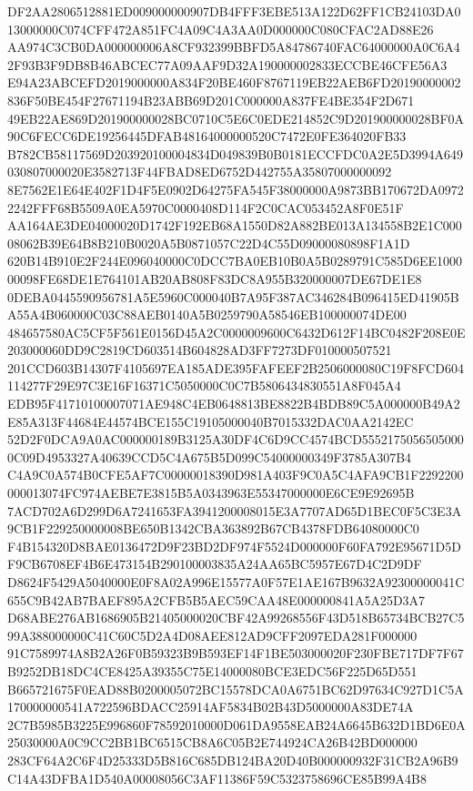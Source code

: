 \documentclass[UTF8,fontset=fandol,zihao=-4,a4paper]{ctexart}
\begin{document}
{{DF2AA2806512881ED009000000907DB4FFF3EBE513A122D62FF1CB24103DA013000000C074CFF472A851FC4A09C4A3AA0D000000C080CFAC2AD88E26
AA974C3CB0DA000000006A8CF932399BBFD5A84786740FAC64000000A0C6A42F93B3F9DB8B46ABCEC77A09AAF9D32A190000002833ECCBE46CFE56A3
E94A23ABCEFD2019000000A834F20BE460F8767119EB22AEB6FD20190000002836F50BE454F27671194B23ABB69D201C000000A837FE4BE354F2D671
49EB22AE869D201900000028BC0710C5E6C0EDE214852C9D201900000028BF0A90C6FECC6DE19256445DFAB48164000000520C7472E0FE364020FB33
B782CB58117569D203920100004834D049839B0B0181ECCFDC0A2E5D3994A649030807000020E3582713F44FBAD8ED6752D442755A35807000000092
8E7562E1E64E402F1D4F5E0902D64275FA545F38000000A9873BB170672DA09722242FFF68B5509A0EA5970C0000408D114F2C0CAC053452A8F0E51F
AA164AE3DE04000020D1742F192EB68A1550D82A882BE013A134558B2E1C00008062B39E64B8B210B0020A5B0871057C22D4C55D09000080898F1A1D
620B14B910E2F244E096040000C0DCC7BA0EB10B0A5B0289791C585D6EE100000098FE68DE1E764101AB20AB808F83DC8A955B320000007DE67DE1E8
0DEBA0445590956781A5E5960C000040B7A95F387AC346284B096415ED41905BA55A4B060000C03C88AEB0140A5B0259790A58546EB100000074DE00
484657580AC5CF5F561E0156D45A2C0000009600C6432D612F14BC0482F208E0E203000060DD9C2819CD603514B604828AD3FF7273DF010000507521
201CCD603B14307F4105697EA185ADE395FAFEEF2B2506000080C19F8FCD604114277F29E97C3E16F16371C5050000C0C7B5806434830551A8F045A4
EDB95F41710100007071AE948C4EB0648813BE8822B4BDB89C5A000000B49A2E85A313F44684E44574BCE155C19105000040B7015332DAC0AA2142EC
52D2F0DCA9A0AC000000189B3125A30DF4C6D9CC4574BCD55521750565050000C09D4953327A40639CCD5C4A675B5D099C54000000349F3785A307B4
C4A9C0A574B0CFE5AF7C00000018390D981A403F9C0A5C4AFA9CB1F2292200000013074FC974AEBE7E3815B5A0343963E55347000000E6CE9E92695B
7ACD702A6D299D6A7241653FA3941200008015E3A7707AD65D1BEC0F5C3E3A9CB1F229250000008BE650B1342CBA363892B67CB4378FDB64080000C0
F4B154320D8BAE0136472D9F23BD2DF974F5524D000000F60FA792E95671D5DF9CB6708EF4B6E473154B290100003835A24AA65BC5957E67D4C2D9DF
D8624F5429A5040000E0F8A02A996E15577A0F57E1AE167B9632A92300000041C655C9B42AB7BAEF895A2CFB5B5AEC59CAA48E000000841A5A25D3A7
D68ABE276AB1686905B21405000020CBF42A99268556F43D518B65734BCB27C599A388000000C41C60C5D2A4D08AEE812AD9CFF2097EDA281F000000
91C7589974A8B2A26F0B59323B9B593EF14F1BE503000020F230FBE717DF7F67B9252DB18DC4CE8425A39355C75E14000080BCE3EDC56F225D65D551
B665721675F0EAD88B0200005072BC15578DCA0A6751BC62D97634C927D1C5A170000000541A722596BDACC25914AF5834B02B43D5000000A83DE74A
2C7B5985B3225E996860F78592010000D061DA9558EAB24A6645B632D1BD6E0A25030000A0C9CC2BB1BC6515CB8A6C05B2E744924CA26B42BD000000
283CF64A2C6F4D25333D5B816C685DB124BA20D40B000000932F31CB2A96B9C14A43DFBA1D540A00008056C3AF11386F59C5323758696CE85B99A4B8
}}
\end{document}
